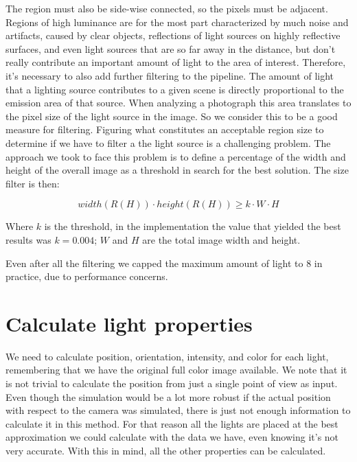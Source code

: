 The region must also be side-wise connected, so the pixels must be adjacent.\newline
Regions of high luminance are for the most part characterized by much noise and artifacts, caused by clear objects, reflections of light sources on highly reflective surfaces, and even light sources that are so far away in the distance, but don't really contribute an important amount of light to the area of interest. Therefore, it's necessary to also add further filtering to the pipeline. \newline
The amount of light that a lighting source contributes to a given scene is directly proportional to the emission area of that source. When analyzing a photograph this area translates to the pixel size of the light source in the image. So we consider this to be a good measure for filtering. Figuring what constitutes an acceptable region size to determine if we have to filter a the light source is a challenging problem. The approach we took to face this problem is to define a percentage of the width and height of the overall image as a threshold in search for the best solution. The size filter is then:

\begin{equation}
    width(R(H)) \cdot height(R(H)) \geq k \cdot W \cdot H
\end{equation}

Where $k$ is the threshold, in the implementation the value that yielded the best results was $k = 0.004$; $W$ and $H$ are the total image width and height.\newline

Even after all the filtering we capped the maximum amount of light to 8 in practice, due to performance concerns.\newline

\section{Calculate light properties}
We need to calculate position, orientation, intensity, and color for each light, remembering that we have the original full color image available. We note that it is not trivial to calculate the position from just a single point of view as input. Even though the simulation would be a lot more robust if the actual position with respect to the camera was simulated, there is just not enough information to calculate it in this method. For that reason all the lights are placed at the best approximation we could calculate with the data we have, even knowing it's not very accurate. \newline
With this in mind, all the other properties can be calculated.

